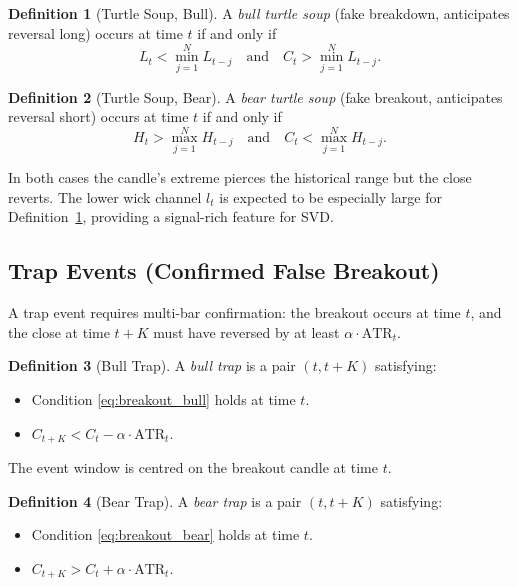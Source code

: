 \documentclass[11pt,a4paper]{article}
\theoremstyle{definition}
\newtheorem{definition}{Definition}[section]
\theoremstyle{plain}
\begin{document}
\begin{definition}[Turtle Soup, Bull]
\label{def:ts_bull}
A \emph{bull turtle soup} (fake breakdown, anticipates reversal long)
occurs at time $t$ if and only if
\begin{equation}
    L_t < \min_{j=1}^{N} L_{t-j}
    \quad \text{and} \quad
    C_t > \min_{j=1}^{N} L_{t-j}.
    \label{eq:ts_bull}
\end{equation}
\end{definition}

\begin{definition}[Turtle Soup, Bear]
\label{def:ts_bear}
A \emph{bear turtle soup} (fake breakout, anticipates reversal short)
occurs at time $t$ if and only if
\begin{equation}
    H_t > \max_{j=1}^{N} H_{t-j}
    \quad \text{and} \quad
    C_t < \max_{j=1}^{N} H_{t-j}.
    \label{eq:ts_bear}
\end{equation}
\end{definition}

In both cases the candle's extreme pierces the historical range but the
close reverts. The lower wick channel $l_t$ is expected to be especially
large for Definition~\ref{def:ts_bull}, providing a signal-rich feature for
SVD.

\subsection{Trap Events (Confirmed False Breakout)}

A trap event requires multi-bar confirmation: the breakout occurs at time
$t$, and the close at time $t + K$ must have reversed by at least
$\alpha \cdot \mathrm{ATR}_t$.

\begin{definition}[Bull Trap]
\label{def:bull_trap}
A \emph{bull trap} is a pair $(t, t+K)$ satisfying:
\begin{itemize}
    \item[(i)] Condition \eqref{eq:breakout_bull} holds at time $t$.
    \item[(ii)] $C_{t+K} < C_t - \alpha \cdot \mathrm{ATR}_t$.
\end{itemize}
The event window is centred on the breakout candle at time $t$.
\end{definition}

\begin{definition}[Bear Trap]
\label{def:bear_trap}
A \emph{bear trap} is a pair $(t, t+K)$ satisfying:
\begin{itemize}
    \item[(i)] Condition \eqref{eq:breakout_bear} holds at time $t$.
    \item[(ii)] $C_{t+K} > C_t + \alpha \cdot \mathrm{ATR}_t$.
\end{itemize}
\end{definition}
\end{document}
